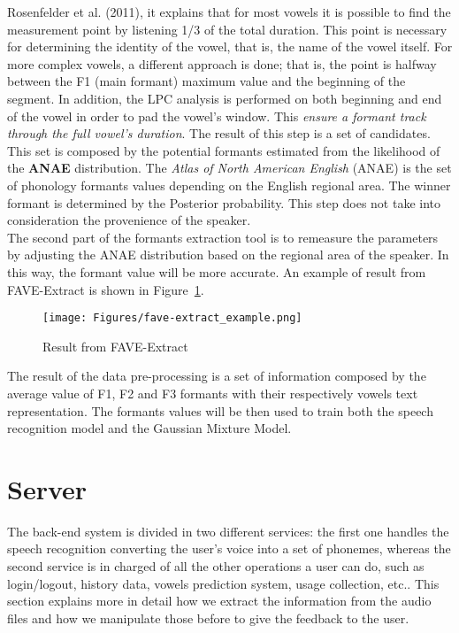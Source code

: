 \noindent Rosenfelder et al. (2011), it explains that for most vowels it is possible to find the measurement point by listening 1/3 of the total duration. This point is necessary for determining the identity of the vowel, that is, the name of the vowel itself. For more complex vowels, a different approach is done; that is, the point is halfway between the F1 (main formant) maximum value and the beginning of the segment. In addition, the LPC analysis is performed on both beginning and end of the vowel in order to pad the vowel's window. This \emph{ensure a formant track through the full vowel's duration}\cite{harrison2004variability}. The result of this step is a set of candidates. This set is composed by the potential formants estimated from the likelihood of the \textbf{ANAE} distribution. The \textit{Atlas of North American English} (ANAE) is the set of phonology formants values depending on the English regional area. The winner formant is determined by the Posterior probability. This step does not take into consideration the provenience of the speaker. \\

\noindent The second part of the formants extraction tool is to remeasure the parameters by adjusting the ANAE distribution based on the regional area of the speaker. In this way, the formant value will be more accurate. An example of result from FAVE-Extract is shown in Figure~\ref{fig:fave-extract_example}.

\begin{figure}[!ht]
	\centering
	\texttt{[image: Figures/fave-extract\_example.png]}
	\caption{Result from FAVE-Extract}
	\label{fig:fave-extract_example}
\end{figure}

\noindent The result of the data pre-processing is a set of information composed by the average value of F1, F2 and F3 formants with their respectively vowels text representation. The formants values will be then used to train both the speech recognition model and the Gaussian Mixture Model.

\section{Server}
\label{sec:server}

The back-end system is divided in two different services: the first one handles the speech recognition converting the user's voice into a set of phonemes, whereas the second service is in charged of all the other operations a user can do, such as login/logout, history data, vowels prediction system, usage collection, etc.. This section explains more in detail how we extract the information from the audio files and how we manipulate those before to give the feedback to the user.


